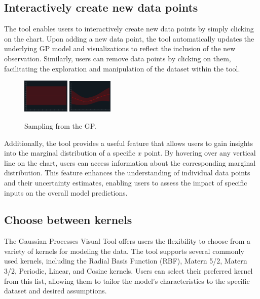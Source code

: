 \documentclass[preprint,journal]{vgtc}       %
\begin{document}
\subsection{Interactively create new data points}

The tool enables users to interactively create new data points by simply clicking on the chart. Upon adding a new data point, the tool automatically updates the underlying GP model and visualizations to reflect the inclusion of the new observation. Similarly, users can remove data points by clicking on them, facilitating the exploration and manipulation of the dataset within the tool.

\begin{figure}[H]
  \centering
  \includegraphics[width=0.2\textwidth]{../imgs/observing.png}
  \includegraphics[width=0.19\textwidth]{../imgs/observed.png}
  \caption{Sampling from the GP.}
\end{figure}

Additionally, the tool provides a useful feature that allows users to gain insights into the marginal distribution of a specific $x$ point. By hovering over any vertical line on the chart, users can access information about the corresponding marginal distribution. This feature enhances the understanding of individual data points and their uncertainty estimates, enabling users to assess the impact of specific inputs on the overall model predictions.

\subsection{Choose between kernels}

The Gaussian Processes Visual Tool offers users the flexibility to choose from a variety of kernels for modeling the data. The tool supports several commonly used kernels, including the Radial Basis Function (RBF), Matern 5/2, Matern 3/2, Periodic, Linear, and Cosine kernels. Users can select their preferred kernel from this list, allowing them to tailor the model's characteristics to the specific dataset and desired assumptions.
\end{document}
